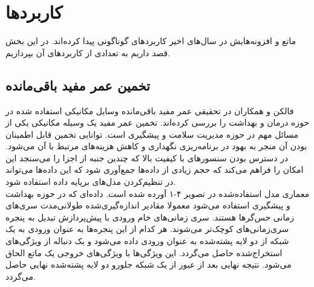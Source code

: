 \chapter{کاربردها}
ماتع و افزونه‌هایش در سال‌های اخیر کاربردهای گوناگونی پیدا کرده‌اند. در این بخش قصد داریم به تعدادی از کاربردهای آن بپردازیم.

\section{تخمین عمر مفید باقی‌مانده}
فالکن و همکاران\cite{falcon2020neural} در تحقیقی عمر مفید باقی‌مانده وسایل مکانیکی استفاده شده در حوزه درمان و بهداشت را بررسی کرده‌اند. تخمین عمر مفید یک وسیله مکانیکی یکی از مسائل مهم در حوزه مدیریت سلامت و پیشگیری است. توانایی تخمین قابل اطمینان بودن آن منجر به بهود در برنامه‌ریزی نگهداری و کاهش هزینه‌های مرتبط با آن می‌شود. در دسترس بودن سنسورهای با کیفیت بالا که چندین جنبه از اجزا را می‌سنجد این امکان را فراهم می‌کند که حجم زیادی از داده‌ها جمع‌آوری شود که این داده‌ها می‌تواند در تنظیم‌کردن مدل‌های برپایه داده استفاده شود.\cite{falcon2020neural}
\\

معماری مدل استفاده‌شده در تصویر ۴-۱ آورده شده است. داده‌ای که در حوزه بهداشت و پیشگیری استفاده می‌شود معمولا مقادیر اندازه‌گیری‌شده طولانی‌مدت سری‌های زمانی حس‌گرها هستند. 
سری زمانی‌های خام ورودی با پیش‌پردازش تبدیل به پنجره سری‌زمانی‌های کوچک‌تر می‌شوند. هر کدام از این پنجره‌ها به عنوان ورودی به یک شبکه از دو لایه پشته‌شده  به عنوان ورودی داده می‌شود و یک دنباله از ویژگی‌های استخراج‌شده حاصل می‌گردد. این ویژگی‌ها با ویژگی‌های خروجی یک ماتع الحاق می‌شود. نتیجه نهایی بعد از عبور از یک شبکه جلورو دو لایه پشته‌شده نهایی حاصل می‌گردد.\cite{falcon2020neural}
\\

